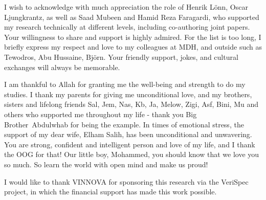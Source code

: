 {I wish to acknowledge with much appreciation the role of Henrik L{\"o}nn, Oscar Ljungkrantz, as well as Saad Mubeen and Hamid Reza Faragardi, who supported my research technically at different levels, including co-authoring joint papers. Your willingness to share and support is highly admired. For the list is too long, I briefly express my respect and love to my colleagues at MDH, and outside such as Tewodros, Abu Hussaine, Bj{\"o}rn. Your friendly support, jokes, and cultural exchanges will always be memorable.

I am thankful to Allah for granting me the well-being and strength to do my studies. I thank my parents for giving me unconditional love, and my brothers, sisters and lifelong friends Sal, Jem, Nas, Kb, Ja, Melow, Zigi, Asf, Bini, Mu and others who supported me throughout my life - thank you Big Brother~Abdulwhab for being the example. In times of emotional stress, the support of my dear wife, Elham Salih, has been unconditional and unwavering. You are strong, confident and intelligent person and love of my life, and I thank the OOG for that! Our little boy, Mohammed, you should know that we love you so much. So learn the world with open mind and make us proud!

I would like to thank VINNOVA for sponsoring this research via the VeriSpec project, in which the financial support has made this work possible.

} %

\newcommand{\halftitlepage}{%
\thispagestyle{empty}
\begin{center}
	ACTA UNIVERSITATIS UPSALIENSIS

	\emph{\series{}}
	
	\serialNumber
\end{center}
\cleardoublepage}

